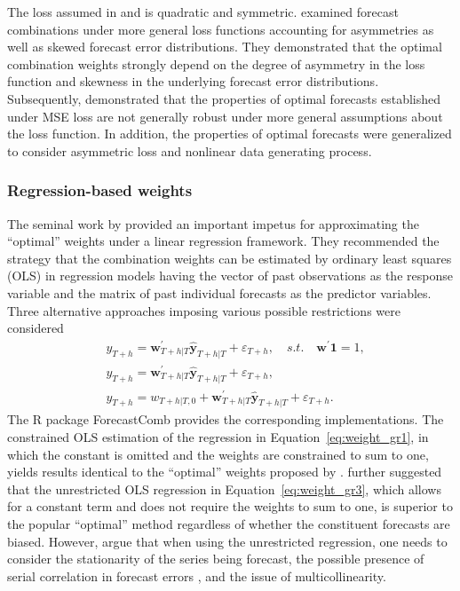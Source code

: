 \documentclass[a4paper,11pt]{article}
\newcommand{\pkg}[1]{{\normalfont\fontseries{b}\selectfont #1}}
\let\proglang=\textsf
\begin{document}
The loss assumed in \citet{Bates1969-yj} and \citet{Newbold1974-lp} is quadratic and symmetric. \citet{Elliott2004-dz} examined forecast combinations under more general loss functions accounting for asymmetries as well as skewed forecast error distributions. They demonstrated that the optimal combination weights strongly depend on the degree of asymmetry in the loss function and skewness in the underlying forecast error distributions. Subsequently, \citet{Patton2007-zo} demonstrated that the properties of optimal forecasts established under MSE loss are not generally robust under more general assumptions about the loss function. In addition, the properties of optimal forecasts were generalized to consider asymmetric loss and nonlinear data generating process.

\subsubsection*{Regression-based weights}

The seminal work by \citet{Granger1984-jc} provided an important impetus for approximating the ``optimal'' weights under a linear regression framework. They recommended the strategy that the combination weights can be estimated by ordinary least squares (OLS) in regression models having the vector of past observations as the response variable and the matrix of past individual forecasts as the predictor variables. Three alternative approaches imposing various possible restrictions were considered
\begin{align}
   & y_{T+h}=\bm{w}_{T+h|T}^{\prime} \hat{\bm{y}}_{T+h|T}+\varepsilon_{T+h}, \quad s.t. \quad \bm{w}^{\prime}\bm{1}=1, \label{eq:weight_gr1} \\
   & y_{T+h}=\bm{w}^{\prime}_{T+h|T} \hat{\bm{y}}_{T+h|T}+\varepsilon_{T+h}, \\
   & y_{T+h}=w_{T+h|T, 0}+\bm{w}_{T+h|T}^{\prime} \hat{\bm{y}}_{T+h|T}+\varepsilon_{T+h}. \label{eq:weight_gr3}
\end{align}
The \proglang{R} package \pkg{ForecastComb} \citep{rForecastComb} provides the corresponding implementations. The constrained OLS estimation of the regression in Equation~\eqref{eq:weight_gr1}, in which the constant is omitted and the weights are constrained to sum to one, yields results identical to the ``optimal'' weights proposed by \citet{Bates1969-yj}. \citet{Granger1984-jc} further suggested that the unrestricted OLS regression in Equation~\eqref{eq:weight_gr3}, which allows for a constant term and does not require the weights to sum to one, is superior to the popular ``optimal'' method regardless of whether the constituent forecasts are biased. However, \citet{De_Menezes2000-vd} argue that when using the unrestricted regression, one needs to consider the stationarity of the series being forecast, the possible presence of serial correlation in forecast errors \citep[see also][]{Diebold1988-sx,Edward_Coulson1993-db}, and the issue of multicollinearity.
\end{document}

